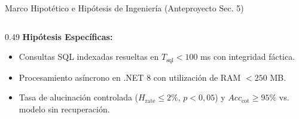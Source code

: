 \documentclass[aspectratio=169, 10pt]{beamer}
\begin{document}
\begin{frame}{Marco Hipotético e Hipótesis de Ingeniería (Anteproyecto Sec. 5)}
\begin{columns}[t]
\begin{column}{0.49\textwidth}
      \vspace{0.05cm}
      {\footnotesize \textbf{Hipótesis Específicas:}}
      \begin{itemize}\scriptsize\setlength{\itemsep}{2pt}
        \item[\textbf{H1.}] Consultas SQL indexadas resueltas en $T_{\text{sql}} < 100$ ms con integridad fáctica.
        \item[\textbf{H2.}] Procesamiento asíncrono en .NET 8 con utilización de RAM $< 250$ MB.
        \item[\textbf{H3.}] Tasa de alucinación controlada ($H_{\text{rate}} \le 2\%$, $p < 0{,}05$) y $Acc_{\text{cot}} \ge 95\%$ vs. modelo sin recuperación.
      \end{itemize}
    \end{column}
  \end{columns}
\end{frame}
\end{document}
